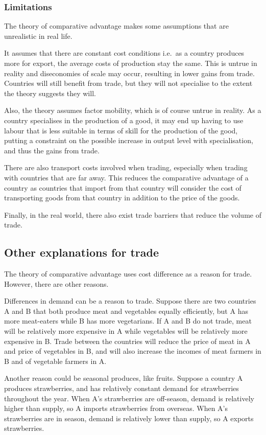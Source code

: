 \documentclass[Economics.tex]{subfiles}
\begin{document}
\subsubsection{Limitations}
The theory of comparative advantage makes some assumptions that are unrealistic in real life.

It assumes that there are constant cost conditions i.e.\ as a country produces more for export, the average costs of production stay the same. This is untrue in reality and diseconomies of scale may occur, resulting in lower gains from trade. Countries will still benefit from trade, but they will not specialise to the extent the theory suggests they will.

Also, the theory assumes factor mobility, which is of course untrue in reality. As a country specialises in the production of a good, it may end up having to use labour that is less suitable in terms of skill for the production of the good, putting a constraint on the possible increase in output level with specialisation, and thus the gains from trade.

There are also transport costs involved when trading, especially when trading with countries that are far away. This reduces the comparative advantage of a country as countries that import from that country will consider the cost of transporting goods from that country in addition to the price of the goods.

Finally, in the real world, there also exist trade barriers that reduce the volume of trade.
\subsection{Other explanations for trade}
The theory of comparative advantage uses cost difference as a reason for trade. However, there are other reasons.

Differences in demand can be a reason to trade. Suppose there are two countries A and B that both produce meat and vegetables equally efficiently, but A has more meat-eaters while B has more vegetarians. If A and B do not trade, meat will be relatively more expensive in A while vegetables will be relatively more expensive in B. Trade between the countries will reduce the price of meat in A and price of vegetables in B, and will also increase the incomes of meat farmers in B and of vegetable farmers in A.

Another reason could be seasonal produces, like fruits. Suppose a country A produces strawberries, and has relatively constant demand for strawberries throughout the year. When A's strawberries are off-season, demand is relatively higher than supply, so A imports strawberries from overseas. When A's strawberries are in season, demand is relatively lower than supply, so A exports strawberries.
\end{document}
